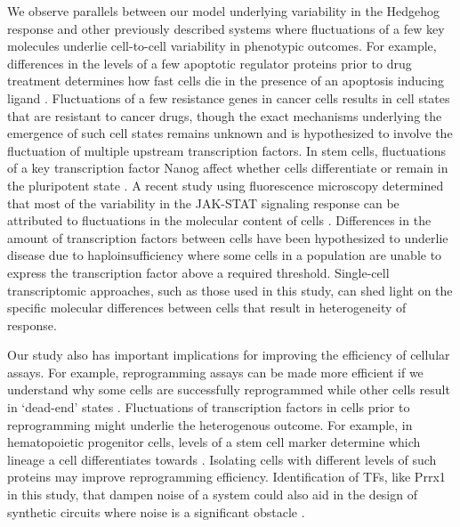 We observe parallels between our model underlying variability in the Hedgehog response and other previously described systems where fluctuations of a few key molecules underlie cell-to-cell variability in phenotypic outcomes. For example, differences in the levels of a few apoptotic regulator proteins prior to drug treatment determines how fast cells die in the presence of an apoptosis inducing ligand \cite{Spencer2009-hh}.  Fluctuations of a few resistance genes in cancer cells results in cell states that are resistant to cancer drugs, \cite{Emert2021-ej,Shaffer2020-ff} though the exact mechanisms underlying the emergence of such cell states remains unknown and is hypothesized to involve the fluctuation of multiple upstream transcription factors. In stem cells, fluctuations of a key transcription factor Nanog affect whether cells differentiate or remain in the pluripotent state \cite{Miyanari2012-zv,Torres-Padilla2014-mz}. A recent study using fluorescence microscopy determined that most of the variability in the JAK-STAT signaling response can be attributed to fluctuations in the molecular content of cells \cite{Topolewski2022-bw}. Differences in the amount of transcription factors between cells have been hypothesized to underlie disease due to haploinsufficiency where some cells in a population are unable to express the transcription factor above a required threshold.\cite{Cook1998-es,Kemkemer2002-iw} Single-cell transcriptomic approaches, such as those used in this study, can shed light on the specific molecular differences between cells that result in heterogeneity of response.

Our study also has important implications for improving the efficiency of cellular assays. For example, reprogramming assays can be made more efficient if we understand why some cells are successfully reprogrammed while other cells result in ‘dead-end’ states \cite{Biddy2018-ct,Graf2009-qr,Francesconi2019-ol}. Fluctuations of transcription factors in cells prior to reprogramming might underlie the heterogenous outcome. For example, in hematopoietic progenitor cells, levels of a stem cell marker determine  which lineage a cell differentiates towards \cite{Chang2008-kv}. Isolating cells with different levels of such proteins may improve reprogramming efficiency. Identification of TFs, like Prrx1 in this study, that dampen noise of a system could also aid in the design of synthetic circuits where noise is a significant obstacle \cite{Murphy2010-zb}.

